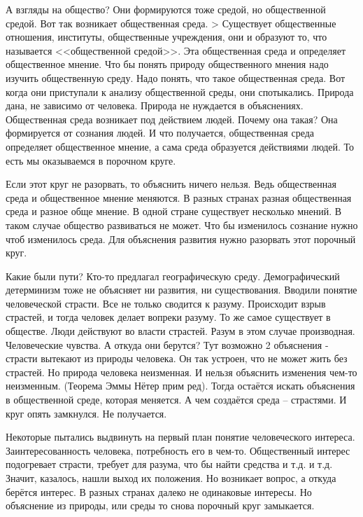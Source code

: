 А взгляды на общество? Они формируются тоже средой, но общественной средой. Вот так возникает общественная среда. > Существует общественные отношения, институты, общественные учреждения, они и образуют то, что называется <<общественной средой>>. Эта общественная среда и определяет общественное мнение. Что бы понять природу общественного мнения надо изучить общественную среду. Надо понять, что такое общественная среда. Вот когда они приступали к анализу общественной среды, они спотыкались. Природа дана, не зависимо от человека. Природа не нуждается в объяснениях. Общественная среда возникает под действием людей. Почему она такая? Она формируется от сознания людей. И что получается, общественная среда определяет общественное мнение, а сама среда образуется действиями людей. То есть мы оказываемся в порочном круге.

Если этот круг не разорвать, то объяснить ничего нельзя. Ведь общественная среда и общественное мнение меняются. В разных странах разная общественная среда и разное обще мнение. В одной стране существует несколько мнений. В таком случае общество развиваться не может. Что бы изменилось сознание нужно чтоб изменилось среда. Для объяснения развития нужно разорвать этот порочный круг.

Какие были пути? Кто-то предлагал географическую среду. Демографический детерминизм тоже не объясняет ни развития, ни существования. Вводили понятие человеческой страсти. Все не только сводится к разуму. Происходит взрыв страстей, и тогда человек делает вопреки разуму. То же самое существует в обществе. Люди действуют во власти страстей. Разум в этом случае производная. Человеческие чувства. А откуда они берутся? Тут возможно 2 объяснения - страсти вытекают из природы человека. Он так устроен, что не может жить без страстей. Но природа человека неизменная. И нельзя объяснить изменения чем-то неизменным. (Теорема Эммы Нётер прим ред). Тогда остаётся искать объяснения в общественной среде, которая меняется. А чем создаётся среда – страстями. И круг опять замкнулся. Не получается.

Некоторые пытались выдвинуть на первый план понятие человеческого интереса. Заинтересованность человека, потребность его в чем-то. Общественный интерес подогревает страсти, требует для разума, что бы найти средства и т.д. и т.д. Значит, казалось, нашли выход их положения. Но возникает вопрос, а откуда берётся интерес. В разных странах далеко не одинаковые интересы. Но объяснение из природы, или среды то снова порочный круг замыкается.

